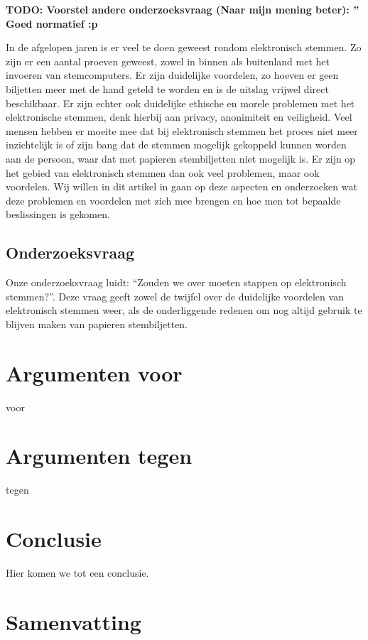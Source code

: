 \documentclass[a4paper]{article}
\newcommand{\TODO}[1]{{\color{red}\textbf{TODO: #1}}}
\begin{document}
\TODO{Voorstel andere onderzoeksvraag (Naar mijn mening beter): '' Goed normatief :p}

In de afgelopen jaren is er veel te doen geweest rondom elektronisch stemmen. Zo zijn er een aantal proeven geweest, zowel in binnen als buitenland met het invoeren van stemcomputers. Er zijn duidelijke voordelen, zo hoeven er geen biljetten meer met de hand geteld te worden en is de uitslag vrijwel direct beschikbaar. Er zijn echter ook duidelijke ethische en morele problemen met het elektronische stemmen, denk hierbij aan privacy, anonimiteit en veiligheid. Veel mensen hebben er moeite mee dat bij elektronisch stemmen het proces niet meer inzichtelijk is of zijn bang dat de stemmen mogelijk gekoppeld kunnen worden aan de persoon, waar dat met papieren stembiljetten niet mogelijk is.
Er zijn op het gebied van elektronisch stemmen dan ook veel problemen, maar ook voordelen. Wij willen in dit artikel in gaan op deze aspecten en onderzoeken wat deze problemen en voordelen met zich mee brengen en hoe men tot bepaalde beslissingen is gekomen.

\subsection{Onderzoeksvraag}

Onze onderzoeksvraag luidt: ``Zouden we over moeten stappen op elektronisch stemmen?''. Deze vraag geeft zowel de twijfel over de duidelijke voordelen van elektronisch stemmen weer, als de onderliggende redenen om nog altijd gebruik te blijven maken van papieren stembiljetten.

\section{Argumenten voor}

voor

\section{Argumenten tegen}

tegen


\section{Conclusie}

Hier komen we tot een conclusie.

\newpage

\section{Samenvatting}

\newpage


\renewcommand\refname{Literatuur}

\end{document}
